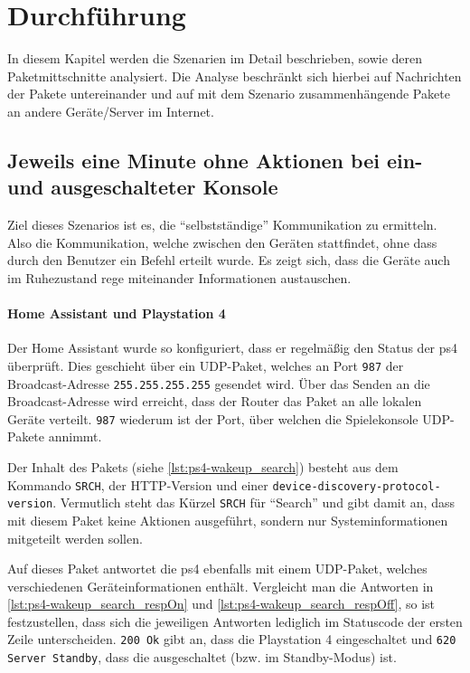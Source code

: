 \newpage
\section{Durchführung}\label{sec:durchfuehrung}
In diesem Kapitel werden die Szenarien im Detail beschrieben,
sowie deren Paketmittschnitte analysiert.
Die Analyse beschränkt sich hierbei auf Nachrichten der Pakete untereinander
und auf mit dem Szenario zusammenhängende Pakete an andere Geräte/Server im Internet.

\subsection{Jeweils eine Minute ohne Aktionen bei ein- und ausgeschalteter Konsole}\label{sec:durchfuehrung-aus}
Ziel dieses Szenarios ist es,
die \enquote{selbstständige} Kommunikation zu ermitteln.
Also die Kommunikation, welche zwischen den Geräten stattfindet, ohne dass durch den Benutzer ein Befehl erteilt wurde.
Es zeigt sich, dass die Geräte auch im Ruhezustand rege miteinander Informationen austauschen.

\paragraph{Home Assistant und Playstation 4}
Der Home Assistant wurde so konfiguriert,
dass er regelmäßig den Status der \ac{ps4} überprüft.
Dies geschieht über ein UDP-Paket,
welches an Port \texttt{987} der Broadcast-Adresse \texttt{255.255.255.255} gesendet wird.
Über das Senden an die Broadcast-Adresse wird erreicht,
dass der Router das Paket an alle lokalen Geräte verteilt.
\texttt{987} wiederum ist der Port, über welchen die Spielekonsole UDP-Pakete annimmt.

Der Inhalt des Pakets (siehe \autoref{lst:ps4-wakeup_search}) besteht aus dem Kommando \texttt{SRCH},
der HTTP-Version und einer \texttt{device-discovery-protocol-version}.
Vermutlich steht das Kürzel \texttt{SRCH} für \enquote{Search} und gibt damit an,
dass mit diesem Paket keine Aktionen ausgeführt,
sondern nur Systeminformationen mitgeteilt werden sollen.



Auf dieses Paket antwortet die \ac{ps4} ebenfalls mit einem UDP-Paket,
welches verschiedenen Geräteinformationen enthält.
Vergleicht man die Antworten in \autoref{lst:ps4-wakeup_search_respOn} und \autoref{lst:ps4-wakeup_search_respOff},
so ist festzustellen,
dass sich die jeweiligen Antworten lediglich im Statuscode der ersten Zeile unterscheiden.
\texttt{200 Ok} gibt an, dass die Playstation 4 eingeschaltet und \texttt{620 Server Standby},
dass die ausgeschaltet (bzw. im Standby-Modus) ist.

